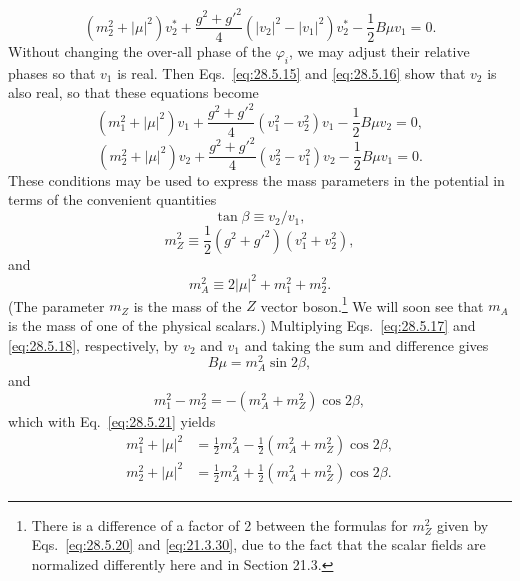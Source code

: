 \begin{equation}
  (m_2^2+|\mu|^2)v_2^*
  +\frac{g^2+g'^2}{4}(|v_2|^2-|v_1|^2)v_2^*
  -\frac12B\mu v_1=0.
  \tag{28.5.16}\label{eq:28.5.16}
\end{equation}
Without changing the over-all phase of the \(\varphi_i\), we may adjust
their relative phases so that \(v_1\) is real. Then
Eqs.~\eqref{eq:28.5.15} and \eqref{eq:28.5.16} show that \(v_2\) is also
real, so that these equations become
\begin{equation}
  (m_1^2+|\mu|^2)v_1
  +\frac{g^2+g'^2}{4}(v_1^2-v_2^2)v_1
  -\frac12B\mu v_2=0,
  \tag{28.5.17}\label{eq:28.5.17}
\end{equation}
\begin{equation}
  (m_2^2+|\mu|^2)v_2
  +\frac{g^2+g'^2}{4}(v_2^2-v_1^2)v_2
  -\frac12B\mu v_1=0.
  \tag{28.5.18}\label{eq:28.5.18}
\end{equation}
These conditions may be used to express the mass parameters in the
potential in terms of the convenient quantities
\begin{equation}
  \tan\beta\equiv v_2/v_1,
  \tag{28.5.19}\label{eq:28.5.19}
\end{equation}
\begin{equation}
  m_Z^2\equiv\frac12(g^2+g'^2)(v_1^2+v_2^2),
  \tag{28.5.20}\label{eq:28.5.20}
\end{equation}
and
\begin{equation}
  m_A^2\equiv2|\mu|^2+m_1^2+m_2^2.
  \tag{28.5.21}\label{eq:28.5.21}
\end{equation}
(The parameter \(m_Z\) is the mass of the \(Z\) vector boson.\footnote{There
is a difference of a factor of 2 between the formulas for \(m_Z^2\) given
by Eqs.~\eqref{eq:28.5.20} and \eqref{eq:21.3.30}, due to the fact that
the scalar fields are normalized differently here and in Section 21.3.}
We will soon see that \(m_A\) is the mass of one of the physical scalars.)
Multiplying Eqs.~\eqref{eq:28.5.17} and \eqref{eq:28.5.18}, respectively,
by \(v_2\) and \(v_1\) and taking the sum and difference gives
\begin{equation}
  B\mu=m_A^2\sin2\beta,
  \tag{28.5.22}\label{eq:28.5.22}
\end{equation}
and
\begin{equation}
  m_1^2-m_2^2=-(m_A^2+m_Z^2)\cos2\beta,
  \tag{28.5.23}\label{eq:28.5.23}
\end{equation}
which with Eq.~\eqref{eq:28.5.21} yields
\begin{equation}
  \begin{aligned}
  m_1^2+|\mu|^2
  &=\frac12m_A^2-\frac12(m_A^2+m_Z^2)\cos2\beta,\\
  m_2^2+|\mu|^2
  &=\frac12m_A^2+\frac12(m_A^2+m_Z^2)\cos2\beta.
  \end{aligned}
  \tag{28.5.24}\label{eq:28.5.24}
\end{equation}
